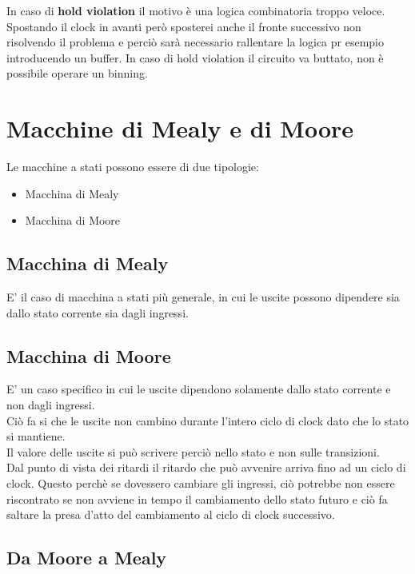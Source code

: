 \documentclass[a4paper]{book}
\begin{document}
In caso di \textbf{hold violation} il motivo è una logica combinatoria troppo veloce.
Spostando il clock in avanti però sposterei anche il fronte successivo non risolvendo il problema e perciò sarà necessario rallentare la logica pr esempio introducendo un buffer.
In caso di hold violation il circuito va buttato, non è possibile operare un binning.


\section{Macchine di Mealy e di Moore}

Le macchine a stati possono essere di due tipologie:
\begin{itemize}
\item Macchina di Mealy
\item Macchina di Moore
\end{itemize}

\subsection*{Macchina di Mealy}

E' il caso di macchina a stati più generale, in cui le uscite possono dipendere sia dallo stato corrente sia dagli ingressi.

\subsection*{Macchina di Moore}
 
E' un caso specifico in cui le uscite dipendono solamente dallo stato corrente e non dagli ingressi.\\
Ciò fa si che le uscite non cambino durante l'intero ciclo di clock dato che lo stato si mantiene.\\
Il valore delle uscite si può scrivere perciò nello stato e non sulle transizioni.\\
Dal punto di vista dei ritardi il ritardo che può avvenire arriva fino ad un ciclo di clock.
Questo perchè se dovessero cambiare gli ingressi, ciò potrebbe non essere riscontrato se non avviene in tempo il cambiamento dello stato futuro e ciò fa saltare la presa d'atto del cambiamento al ciclo di clock successivo.\\

\subsection*{Da Moore a Mealy}
\end{document}
